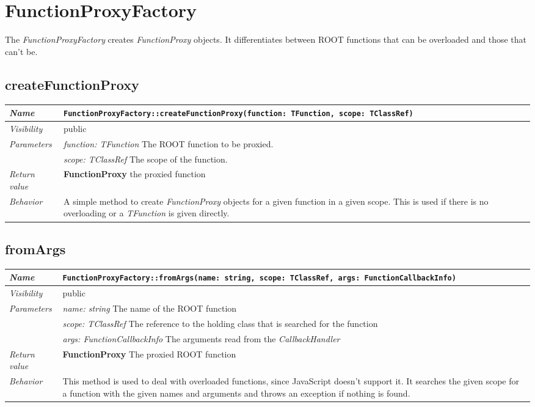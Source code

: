\chapter{FunctionProxyFactory}
The \textit{FunctionProxyFactory} creates \textit{FunctionProxy} objects. It differentiates between ROOT functions that can be overloaded and those that can't be.
\section{createFunctionProxy}
\begin{longtable}{p{3cm} @{\hskip 1cm} p{12cm}}
 \hline
\textit{Name} & \texttt{FunctionProxyFactory::createFunctionProxy(function: TFunction, scope: TClassRef)}\\
\hline
 \textit{Visibility} & public\\
\hline
\textit{Parameters} & \textit{function: TFunction} The ROOT function to be proxied. \\ 
& \textit{scope: TClassRef} The scope of the function.\\
\hline
\textit{Return value} & \textbf{FunctionProxy} the proxied function\\
  \hline
 \textit{Behavior} & A simple method to create \textit{FunctionProxy} objects for a given function in a given scope. This is used if there is no overloading or a \textit{TFunction} is given directly.\\
\hline
\end{longtable} 
 \section{fromArgs}
\begin{longtable}{p{3cm} @{\hskip 1cm} p{12cm}}
 \hline	
\textit{Name} & \texttt{FunctionProxyFactory::fromArgs(name: string, scope: TClassRef, args: FunctionCallbackInfo)}\\
\hline
 \textit{Visibility} & public\\
\hline
\textit{Parameters} & \textit{name: string} The name of the ROOT function \\ & \textit{scope: TClassRef} The reference to the holding class that is searched for the function \\ &\textit{args: FunctionCallbackInfo} The arguments read from the \textit{CallbackHandler}\\
\hline
\textit{Return value} & \textbf{FunctionProxy} The proxied ROOT function\\
  \hline
 \textit{Behavior} & This method is used to deal with overloaded functions, since JavaScript doesn't support it. It searches the given scope for a function with the given names and arguments and throws an exception if nothing is found.\\
\hline
\end{longtable} \pagebreak
